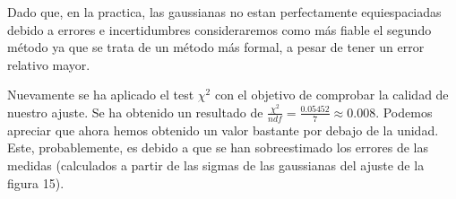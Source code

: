 \begin{enumerate}
Dado que, en la practica, las gaussianas no estan perfectamente equiespaciadas debido a errores e incertidumbres consideraremos como más fiable el segundo método ya que se trata de un método más formal, a pesar de tener un error relativo mayor.

Nuevamente se ha aplicado el test $\chi^2$ con el objetivo de comprobar la calidad de nuestro ajuste. Se ha obtenido un resultado de $\frac{\chi^2}{ndf}=\frac{0.05452}{7}\approx 0.008$. Podemos apreciar que ahora hemos obtenido un valor bastante por debajo de la unidad. Este, probablemente, es debido a que se han sobreestimado los errores de las medidas (calculados a partir de las sigmas de las gaussianas del ajuste de la figura 15).

\end{enumerate}